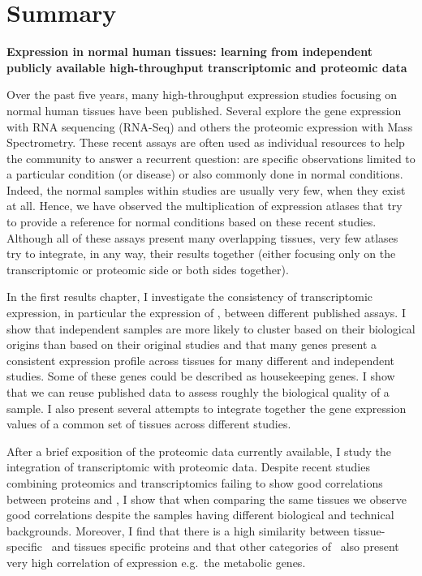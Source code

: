 \clearpage
\chapter*{Summary}
\label{ch:summary}

\begin{singlespace}


    \textbf{Expression in normal human tissues: learning from
    independent publicly available high-throughput transcriptomic and proteomic
    data}
    {\small Over the past five years, many high-throughput expression studies
    focusing on normal human tissues have been published. Several explore
    the gene expression with \gls{RNA} sequencing (\gls{RNA-Seq}) and others
    the proteomic expression with Mass Spectrometry. These recent assays are
    often used as individual resources to help the community to answer a
    recurrent question: are specific observations limited to a particular
    condition (or disease) or also commonly done in normal conditions.
    Indeed, the normal samples within studies are usually very few, when they
    exist at all. Hence, we have observed the multiplication of expression
    atlases that try to provide a reference for normal conditions based on
    these recent studies. Although all of these assays
    present many overlapping tissues, very few atlases try to integrate,
    in any way, their results together (either focusing only on the
    transcriptomic or proteomic side or both sides together).

    In the first results chapter, I investigate the consistency of
    transcriptomic expression, in particular the expression of \mRNAs,
    between different published assays. I show that independent samples are
    more likely to cluster based on their biological origins than based on
    their original studies and that many genes present a consistent expression
    profile across tissues for many different and independent studies. Some
    of these genes could be described as housekeeping genes. I show that we
    can reuse published data to assess roughly the biological quality of a
    sample. I also present several attempts to integrate together the gene
    expression values of a common set of tissues across different studies.

    After a brief exposition of the proteomic data currently available, I
    study the integration of transcriptomic with proteomic data. Despite
    recent studies combining proteomics and transcriptomics failing to show
    good correlations between proteins and \mRNAs, I show that when comparing
    the same tissues we observe good correlations despite the samples having
    different biological and technical backgrounds. Moreover, I find that
    there is a high similarity between tissue-specific \mRNAs\ and tissues
    specific proteins and that other categories of \mRNAs\ also present very
    high correlation of expression e.g.\ the metabolic genes.

}
\end{singlespace}
